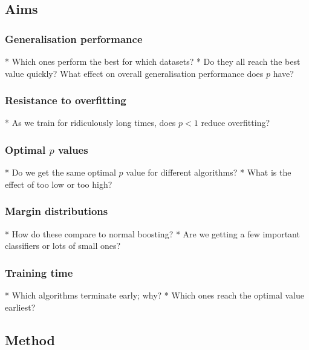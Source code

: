 \subsection{Aims}

\subsubsection{Generalisation performance}

* Which ones perform the best for which datasets?
* Do they all reach the best value quickly?  What effect on overall generalisation performance does $p$ have?

\subsubsection{Resistance to overfitting}

* As we train for ridiculously long times, does $p < 1$ reduce overfitting?

\subsubsection{Optimal $p$ values}

* Do we get the same optimal $p$ value for different algorithms?
* What is the effect of too low or too high?

\subsubsection{Margin distributions}

* How do these compare to normal boosting?
* Are we getting a few important classifiers or lots of small ones?

\subsubsection{Training time}

* Which algorithms terminate early; why?
* Which ones reach the optimal value earliest?

\subsection{Method}


